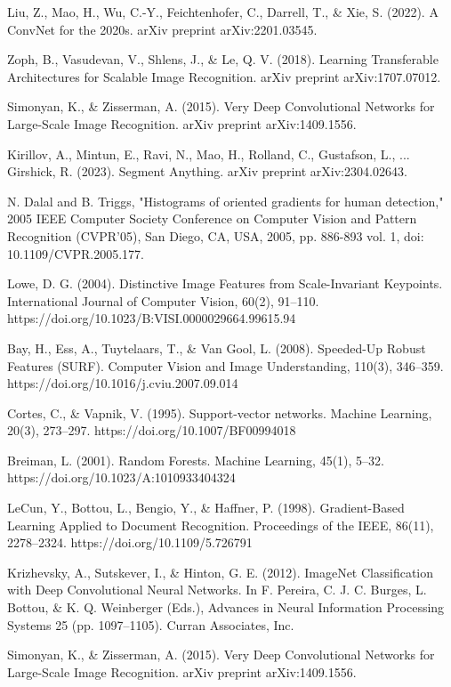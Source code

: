 \documentclass[10pt,a4paper,twocolumn,twoside]{article}
\begin{document}
\begin{thebibliography}{11}
Liu, Z., Mao, H., Wu, C.-Y., Feichtenhofer, C., Darrell, T., \& Xie, S. (2022). A ConvNet for the 2020s. arXiv preprint arXiv:2201.03545.

Zoph, B., Vasudevan, V., Shlens, J., \& Le, Q. V. (2018). Learning Transferable Architectures for Scalable Image Recognition. arXiv preprint arXiv:1707.07012.

Simonyan, K., \& Zisserman, A. (2015). Very Deep Convolutional Networks for Large-Scale Image Recognition. arXiv preprint arXiv:1409.1556.

Kirillov, A., Mintun, E., Ravi, N., Mao, H., Rolland, C., Gustafson, L., ... Girshick, R. (2023). Segment Anything. arXiv preprint arXiv:2304.02643.

N. Dalal and B. Triggs, "Histograms of oriented gradients for human detection," 2005 IEEE Computer Society Conference on Computer Vision and Pattern Recognition (CVPR'05), San Diego, CA, USA, 2005, pp. 886-893 vol. 1, doi: 10.1109/CVPR.2005.177.

Lowe, D. G. (2004). Distinctive Image Features from Scale-Invariant Keypoints. International Journal of Computer Vision, 60(2), 91–110. https://doi.org/10.1023/B:VISI.0000029664.99615.94

Bay, H., Ess, A., Tuytelaars, T., \& Van Gool, L. (2008). Speeded-Up Robust Features (SURF). Computer Vision and Image Understanding, 110(3), 346–359. https://doi.org/10.1016/j.cviu.2007.09.014

Cortes, C., \& Vapnik, V. (1995). Support-vector networks. Machine Learning, 20(3), 273–297. https://doi.org/10.1007/BF00994018

Breiman, L. (2001). Random Forests. Machine Learning, 45(1), 5–32. https://doi.org/10.1023/A:1010933404324

LeCun, Y., Bottou, L., Bengio, Y., \& Haffner, P. (1998). Gradient-Based Learning Applied to Document Recognition. Proceedings of the IEEE, 86(11), 2278–2324. https://doi.org/10.1109/5.726791

Krizhevsky, A., Sutskever, I., \& Hinton, G. E. (2012). ImageNet Classification with Deep Convolutional Neural Networks. In F. Pereira, C. J. C. Burges, L. Bottou, \& K. Q. Weinberger (Eds.), Advances in Neural Information Processing Systems 25 (pp. 1097–1105). Curran Associates, Inc.

Simonyan, K., \& Zisserman, A. (2015). Very Deep Convolutional Networks for Large-Scale Image Recognition. arXiv preprint arXiv:1409.1556.


\end{thebibliography}
\end{document}
